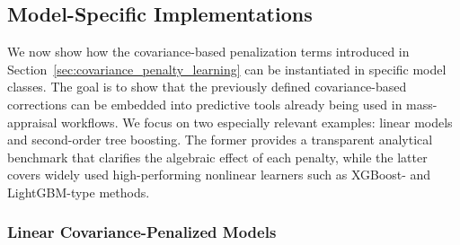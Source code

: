 \documentclass[12pt, draft]{article}
\theoremstyle{plain}
\theoremstyle{definition}
\newcommand{\1}{\mathbf{1}}
\begin{document}



\subsection{Model-Specific Implementations}
\label{sec:model_specific_implementations}

We now show how the covariance-based penalization terms introduced in Section~\ref{sec:covariance_penalty_learning} can be instantiated in specific model classes. The goal is to show that the previously defined covariance-based corrections can be embedded into predictive tools already being used in mass-appraisal workflows. We focus on two especially relevant examples: linear models and second-order tree boosting. The former provides a transparent analytical benchmark that clarifies the algebraic effect of each penalty, while the latter covers widely used high-performing nonlinear learners such as XGBoost- and LightGBM-type methods. 


\subsubsection{Linear Covariance-Penalized Models}
\label{subsec:linear_models}
\end{document}
